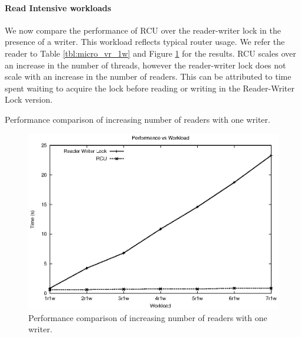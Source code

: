 \documentclass[a4paper]{article}
\begin{document}
\paragraph{Read Intensive workloads}
We now compare the performance of RCU over the reader-writer lock in the presence of a writer. This workload reflects typical router usage. We refer the reader to Table \ref{tbl:micro_vr_1w} and Figure \ref{img:micro_vr_1w} for the results.
RCU scales over an increase in the number of threads, however the reader-writer lock does not scale with an increase in the number of readers. This can be attributed to time spent waiting to acquire the lock before reading or writing in the Reader-Writer Lock version.

\begin{table}[tph]
\begin{center}

\end{center}
\label{tbl:micro_vr_1w}
\caption{Performance comparison of increasing number of readers with one writer.}
\end{table}

\begin{figure}[tph]
\begin{center}
\includegraphics[scale = 0.7]{../images/graphs/micro_vr_1w}
\caption{Performance comparison of increasing number of readers with one writer.}
\label{img:micro_vr_1w}
\end{center}
\end{figure}
\end{document}
